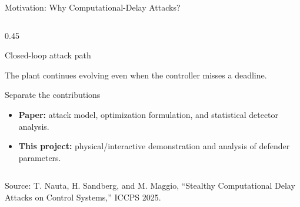 \documentclass[9pt,aspectratio=169]{beamer}
\newcommand{\paperref}{\tiny Source: T. Nauta, H. Sandberg, and M. Maggio, ``Stealthy Computational Delay Attacks on Control Systems,'' ICCPS 2025.}
\newcommand{\tightitemize}{
    \setlength{\itemsep}{1.5pt}
    \setlength{\parskip}{0pt}
    \setlength{\topsep}{2pt}
}
\begin{document}
\begin{frame}{Motivation: Why Computational-Delay Attacks?}
\begin{columns}[T,onlytextwidth]
\begin{column}{0.45\textwidth}
\begin{block}{Closed-loop attack path}

\vspace{1mm}

\small The plant continues evolving even when the controller
misses a deadline.

\end{block}

\begin{block}{Separate the contributions}
\begin{itemize}
\tightitemize
    \item \textbf{Paper:} attack model, optimization formulation,
    and statistical detector analysis.

    \item \textbf{This project:} physical/interactive demonstration
    and analysis of defender parameters.
\end{itemize}
\end{block}

\end{column}
\end{columns}

\vfill
{\paperref}

\end{frame}
\end{document}
